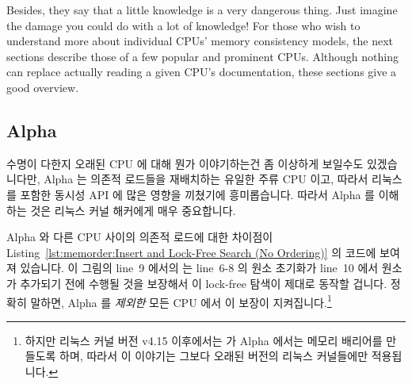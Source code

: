 Besides, they say that a little knowledge is a very dangerous thing.
Just imagine the damage you could do with a lot of knowledge!
For those who wish to understand more about individual CPUs'
memory consistency models, the next sections describe those of a few
popular and prominent CPUs.
Although nothing can replace actually reading a given CPU's documentation,
these sections give a good overview.
\fi

\subsection{Alpha}
\label{sec:memorder:Alpha}

수명이 다한지 오래된 CPU 에 대해 뭔가 이야기하는건 좀 이상하게 보일수도
있겠습니다만, Alpha 는 의존적 로드들을 재배치하는 유일한 주류 CPU 이고, 따라서
리눅스를 포함한 동시성 API 에 많은 영향을 끼쳤기에 흥미롭습니다.
따라서 Alpha 를 이해하는 것은 리눅스 커널 해커에게 매우 중요합니다.

Alpha 와 다른 CPU 사이의 의존적 로드에 대한 차이점이
Listing~\ref{lst:memorder:Insert and Lock-Free Search (No Ordering)}
의 코드에 보여져 있습니다.
이 그림의 line~9 에서의  는 line~6-8 의 원소 초기화가 line~10
에서 원소가 추가되기 전에 수행될 것을 보장해서 이 lock-free 탐색이 제대로
동작할 겁니다.
정확히 말하면, Alpha 를 {\em 제외한} 모든 CPU 에서 이 보장이
지켜집니다.\footnote{
	하지만 리눅스 커널 버전 v4.15 이후에서는  가 Alpha
	에서는 메모리 배리어를 만들도록 하며, 따라서 이 이야기는 그보다 오래된
	버전의 리눅스 커널들에만 적용됩니다.}

